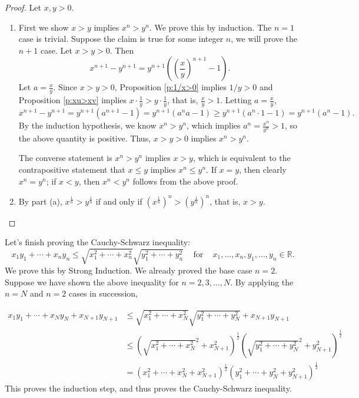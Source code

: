 \documentclass[11pt,dvipsnames]{book}
\numberwithin{figure}{section} %
\numberwithin{table}{section} %
\begin{document}
\begin{proof}
Let $x,y>0$.
\begin{enumerate}[label=(\alph*)]
\item First we show $x>y$ implies $x^n>y^n$. We prove this by induction. The $n=1$ case is trivial. Suppose the claim is true for some integer $n$, we will prove the $n+1$ case. Let $x>y>0$. Then
\[
x^{n+1}-y^{n+1}
=y^{n+1}\left(\left(\frac{x}{y}\right)^{n+1}-1\right).
\]
Let $a=\frac{x}{y}$. Since $x>y>0$, Proposition \ref{p:1/x>0} implies $1/y>0$ and  Proposition \ref{p:xu>xv} implies $x\cdot \frac{1}{y}>y\cdot\frac{1}{y}$, that is, $\frac{x}{y}>1$. Letting $a=\frac{x}{y}$,
\[
x^{n+1}-y^{n+1}
=y^{n+1}\left(a^{n+1}-1\right)
=y^{n+1}(a^{n}a-1)
\geq y^{n+1}(a^{n}\cdot 1-1)
= y^{n+1}(a^{n}-1).
\]
By the induction hypothesis, we know $x^n>y^n$, which implies $a^{n}=\frac{x^{n}}{y^{n}}>1$, so the above quantity is positive. Thus, $x>y>0$ implies $x^n>y^n$.

The converse statement is $x^n>y^n$ implies $x>y$, which is equivalent to the contrapositive statement that $x\leq y$ implies $x^{n}\leq y^{n}$. If $x=y$, then clearly $x^n=y^n$; if $x<y$, then $x^n<y^n$ follows from the above proof.

\item By part (a), $x^{\frac{1}{n}}>y^{\frac{1}{n}}$ if and only if $(x^{\frac{1}{n}})^{n}>(y^{\frac{1}{n}})^{n}$, that is, $x>y$.
\end{enumerate}
\end{proof}

Let's finish proving the Cauchy-Schwarz inequality:
\[
x_{1}y_{1}+\cdots + x_{n}y_{n}
\leq \sqrt{x_{1}^2+\cdots + x_{n}^{2}} \sqrt{y_{1}^2+\cdots + y_{n}^{2}} \;\;\; \mbox{ for } \;\;\; x_{1},...,x_{n},y_{1},...,y_{n}\in\mathbb{R}.
\]
We prove this by Strong Induction.  We already proved the base case $n=2$. Suppose we have shown the above inequality for $n=2,3,...,N$. By applying the $n=N$ and $n=2$ cases in succession,

\begin{align*}
x_{1}y_{1}+\cdots + x_{N}y_{N}+x_{N+1}y_{N+1}
& \leq \sqrt{x_{1}^2+\cdots + x_{N}^{2}} \sqrt{y_{1}^2+\cdots + y_{N}^{2}}+x_{N+1}y_{N+1}\\
& \leq  \left(  \sqrt{x_{1}^2+\cdots + x_{N}^{2}}^{2}+x_{N+1}^{2}\right)^{\frac{1}{2}}
\left(  \sqrt{y_{1}^2+\cdots + y_{N}^{2}}^{2}+y_{N+1}^{2}\right)^{\frac{1}{2}}\\
& =\left(x_{1}^{2}+\cdots + x_{N}^{2}+x_{N+1}^{2}\right)^{\frac{1}{2}}
\left(y_{1}^{2}+\cdots + y_{N}^{2}+y_{N+1}^{2}\right)^{\frac{1}{2}}
\end{align*}
This proves the induction step, and thus proves the Cauchy-Schwarz inequality.
\end{document}

